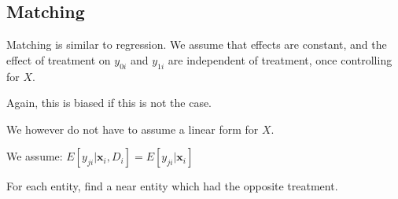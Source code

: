 
\subsection{Matching}

Matching is similar to regression. We assume that effects are constant, and the effect of treatment on \(y_{0i}\) and \(y_{1i}\) are independent of treatment, once controlling for \(X\).

Again, this is biased if this is not the case.

We however do not have to assume a linear form for \(X\).

We assume: \(E[y_{ji}|\mathbf x_{i}, D_i]=E[y_{ji}|\mathbf x_{i}]\)

For each entity, find a near entity which had the opposite treatment.


